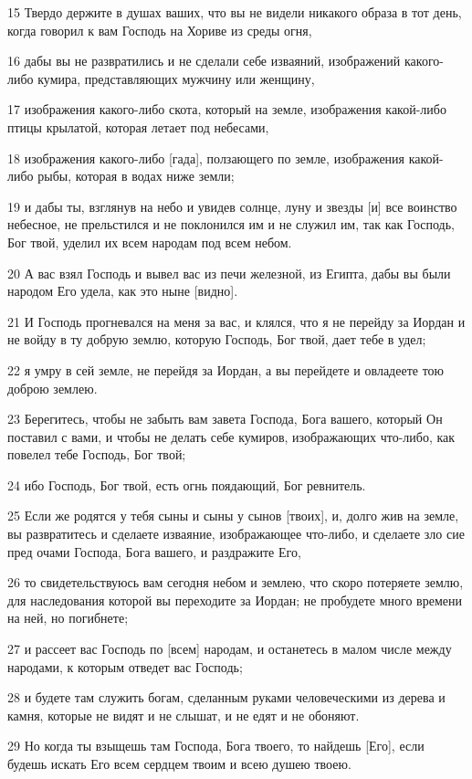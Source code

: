 \par 15 Твердо держите в душах ваших, что вы не видели никакого образа в тот день, когда говорил к вам Господь на Хориве из среды огня,
\par 16 дабы вы не развратились и не сделали себе изваяний, изображений какого-либо кумира, представляющих мужчину или женщину,
\par 17 изображения какого-либо скота, который на земле, изображения какой-либо птицы крылатой, которая летает под небесами,
\par 18 изображения какого-либо [гада], ползающего по земле, изображения какой-либо рыбы, которая в водах ниже земли;
\par 19 и дабы ты, взглянув на небо и увидев солнце, луну и звезды [и] все воинство небесное, не прельстился и не поклонился им и не служил им, так как Господь, Бог твой, уделил их всем народам под всем небом.
\par 20 А вас взял Господь и вывел вас из печи железной, из Египта, дабы вы были народом Его удела, как это ныне [видно].
\par 21 И Господь прогневался на меня за вас, и клялся, что я не перейду за Иордан и не войду в ту добрую землю, которую Господь, Бог твой, дает тебе в удел;
\par 22 я умру в сей земле, не перейдя за Иордан, а вы перейдете и овладеете тою доброю землею.
\par 23 Берегитесь, чтобы не забыть вам завета Господа, Бога вашего, который Он поставил с вами, и чтобы не делать себе кумиров, изображающих что-либо, как повелел тебе Господь, Бог твой;
\par 24 ибо Господь, Бог твой, есть огнь поядающий, Бог ревнитель.
\par 25 Если же родятся у тебя сыны и сыны у сынов [твоих], и, долго жив на земле, вы развратитесь и сделаете изваяние, изображающее что-либо, и сделаете зло сие пред очами Господа, Бога вашего, и раздражите Его,
\par 26 то свидетельствуюсь вам сегодня небом и землею, что скоро потеряете землю, для наследования которой вы переходите за Иордан; не пробудете много времени на ней, но погибнете;
\par 27 и рассеет вас Господь по [всем] народам, и останетесь в малом числе между народами, к которым отведет вас Господь;
\par 28 и будете там служить богам, сделанным руками человеческими из дерева и камня, которые не видят и не слышат, и не едят и не обоняют.
\par 29 Но когда ты взыщешь там Господа, Бога твоего, то найдешь [Его], если будешь искать Его всем сердцем твоим и всею душею твоею.
